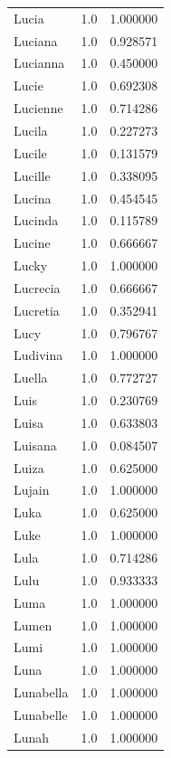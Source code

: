 \documentclass[
  letterpaper,
  DIV=11,
  numbers=noendperiod]{scrreprt}
\begin{document}
\begin{tabular}{lrr}
Lucia           &   1.0 &   1.000000 \\
Luciana         &   1.0 &   0.928571 \\
Lucianna        &   1.0 &   0.450000 \\
Lucie           &   1.0 &   0.692308 \\
Lucienne        &   1.0 &   0.714286 \\
Lucila          &   1.0 &   0.227273 \\
Lucile          &   1.0 &   0.131579 \\
Lucille         &   1.0 &   0.338095 \\
Lucina          &   1.0 &   0.454545 \\
Lucinda         &   1.0 &   0.115789 \\
Lucine          &   1.0 &   0.666667 \\
Lucky           &   1.0 &   1.000000 \\
Lucrecia        &   1.0 &   0.666667 \\
Lucretia        &   1.0 &   0.352941 \\
Lucy            &   1.0 &   0.796767 \\
Ludivina        &   1.0 &   1.000000 \\
Luella          &   1.0 &   0.772727 \\
Luis            &   1.0 &   0.230769 \\
Luisa           &   1.0 &   0.633803 \\
Luisana         &   1.0 &   0.084507 \\
Luiza           &   1.0 &   0.625000 \\
Lujain          &   1.0 &   1.000000 \\
Luka            &   1.0 &   0.625000 \\
Luke            &   1.0 &   1.000000 \\
Lula            &   1.0 &   0.714286 \\
Lulu            &   1.0 &   0.933333 \\
Luma            &   1.0 &   1.000000 \\
Lumen           &   1.0 &   1.000000 \\
Lumi            &   1.0 &   1.000000 \\
Luna            &   1.0 &   1.000000 \\
Lunabella       &   1.0 &   1.000000 \\
Lunabelle       &   1.0 &   1.000000 \\
Lunah           &   1.0 &   1.000000 \\

\end{tabular}
\end{document}
